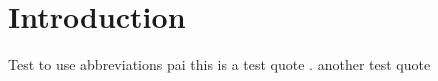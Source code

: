 \chapter{Introduction}\label{chap:01intro}
Test to use abbreviations \ac{pai}
this is a test quote \cite{EuropeanAssociationforBiometrics.2012}.
another test quote \cite{Busch.2014}